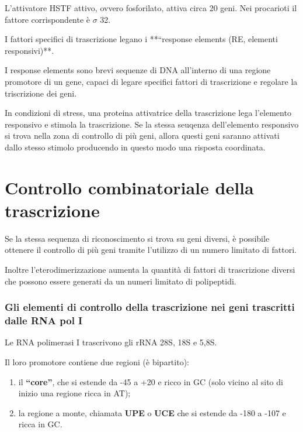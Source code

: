 \documentclass[11pt]{book}
\begin{document}
L'attivatore HSTF attivo, ovvero fosforilato, attiva circa 20 geni. Nei
procarioti il fattore corrispondente è \(\sigma\) 32.

I fattori specifici di trascrizione legano i **``response elements (RE,
elementi responsivi)**.

I response elements sono brevi sequenze di DNA all'interno di una
regione promotore di un gene, capaci di legare specifici fattori di
trascrizione e regolare la triscrizione dei geni.

In condizioni di stress, una proteina attivatrice della trascrizione
lega l'elemento responsivo e stimola la trascrizione. Se la stessa
seuqenza dell'elemento responsivo si trova nella zona di controllo di
più geni, allora questi geni saranno attivati dallo stesso stimolo
producendo in questo modo una risposta coordinata.

\section{Controllo combinatoriale della
trascrizione}\label{controllo-combinatoriale-della-trascrizione}

Se la stessa sequenza di riconoscimento si trova su geni diversi, è
possibile ottenere il controllo di più geni tramite l'utilizzo di un
numero limitato di fattori.

Inoltre l'eterodimerizzazione aumenta la quantità di fattori di
trascrizione diversi che possono essere generati da un numeri limitato
di polipeptidi.

\subsubsection{Gli elementi di controllo della trascrizione nei geni
trascritti dalle RNA pol
I}\label{gli-elementi-di-controllo-della-trascrizione-nei-geni-trascritti-dalle-rna-pol-i}

Le RNA polimerasi I trascrivono gli rRNA 28S, 18S e 5,8S.

Il loro promotore contiene due regioni (è bipartito):

\begin{enumerate}
\def\labelenumi{\arabic{enumi}.}
\itemsep1pt\parskip0pt
\item
  il \textbf{``core''}, che si estende da -45 a +20 e ricco in GC (solo
  vicino al sito di inizio una regione ricca in AT);
\item
  la regione a monte, chiamata \textbf{UPE} o \textbf{UCE} che si
  estende da -180 a -107 e ricca in GC.
\end{enumerate}
\end{document}
